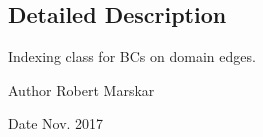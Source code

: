 \subsection{Detailed Description}
Indexing class for B\+Cs on domain edges. 

\begin{DoxyAuthor}{Author}
Robert Marskar 
\end{DoxyAuthor}
\begin{DoxyDate}{Date}
Nov. 2017 
\end{DoxyDate}
